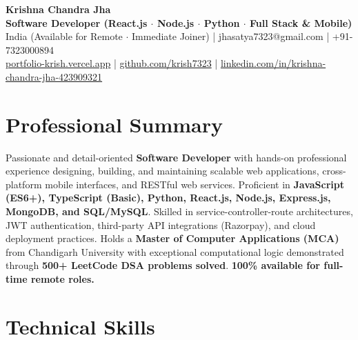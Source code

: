 \documentclass[a4paper,10pt]{article}
\begin{document}
\begin{center}

    {\LARGE \textbf{Krishna Chandra Jha}} \\[2.5pt]

    \textbf{Software Developer (React.js $\cdot$ Node.js $\cdot$ Python $\cdot$ Full Stack \& Mobile)} \\[3.5pt]

    India (Available for Remote $\cdot$ Immediate Joiner)
    \quad | \quad
    jhasatya7323@gmail.com
    \quad | \quad
    +91-7323000894
    \\[2.5pt]

    \href{https://portfolio-ashen-alpha-dv0whhsamo.vercel.app/}{portfolio-krish.vercel.app}
    \quad | \quad
    \href{https://github.com/krish7323}{github.com/krish7323}
    \quad | \quad
    \href{https://linkedin.com/in/krishna-chandra-jha-423909321}
    {linkedin.com/in/krishna-chandra-jha-423909321}

\end{center}

\section*{Professional Summary}

Passionate and detail-oriented \textbf{Software Developer} with hands-on professional experience designing, building, and maintaining scalable web applications, cross-platform mobile interfaces, and RESTful web services. Proficient in \textbf{JavaScript (ES6+), TypeScript (Basic), Python, React.js, Node.js, Express.js, MongoDB, and SQL/MySQL}. Skilled in service-controller-route architectures, JWT authentication, third-party API integrations (Razorpay), and cloud deployment practices. Holds a \textbf{Master of Computer Applications (MCA)} from Chandigarh University with exceptional computational logic demonstrated through \textbf{500+ LeetCode DSA problems solved}. \textbf{100\% available for full-time remote roles.}

\section*{Technical Skills}
\end{document}
